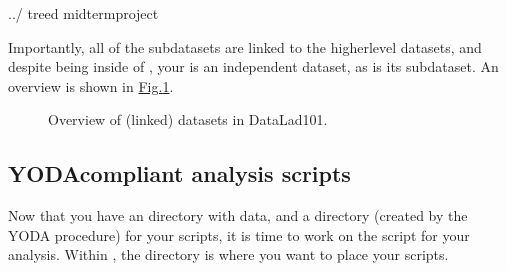 \begin{sphinxVerbatim}[commandchars=\\\{\}]
../
tree\PYGZhy{}d
midterm\PYGZus{}project

\end{sphinxVerbatim}

\sphinxAtStartPar
Importantly, all of the subdatasets are linked to the higher\sphinxhyphen{}level datasets,
and despite being inside of , your  is an independent
dataset, as is its  subdataset. An overview is shown in \hyperref[\detokenize{basics/101-130-yodaproject:fig-linkeddl101}]{Fig.\@ \ref{\detokenize{basics/101-130-yodaproject:fig-linkeddl101}}}.

\begin{figure}[bp]
\centering
\capstart

\noindent{}
\caption{Overview of (linked) datasets in DataLad\sphinxhyphen{}101.}\label{\detokenize{basics/101-130-yodaproject:id8}}\label{\detokenize{basics/101-130-yodaproject:fig-linkeddl101}}\end{figure}


\subsection{YODA\sphinxhyphen{}compliant analysis scripts}
\label{\detokenize{basics/101-130-yodaproject:yoda-compliant-analysis-scripts}}
\sphinxAtStartPar
Now that you have an  directory with data, and a  directory
(created by the YODA procedure) for your scripts, it is time to work on the script
for your analysis. Within , the  directory is where
you want to place your scripts.

